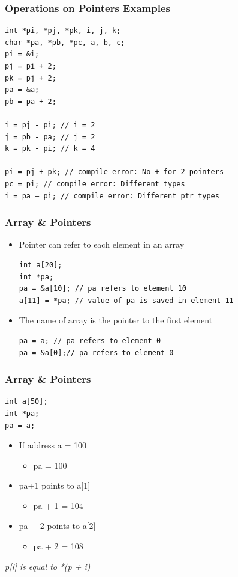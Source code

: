 \documentclass{../c-lecture}
\begin{document}
\begin{frame}[fragile]
  \frametitle{Operations on Pointers Examples}
  \begin{verbatim}
int *pi, *pj, *pk, i, j, k;
char *pa, *pb, *pc, a, b, c;
pi = &i;
pj = pi + 2;
pk = pj + 2;
pa = &a;
pb = pa + 2;

i = pj - pi; // i = 2
j = pb - pa; // j = 2
k = pk - pi; // k = 4

pi = pj + pk; // compile error: No + for 2 pointers
pc = pi; // compile error: Different types
i = pa – pi; // compile error: Different ptr types
  \end{verbatim}
\end{frame}

\begin{frame}[fragile]
  \frametitle{Array \& Pointers}
  \begin{itemize}
    \item Pointer can refer to each element in an array
    \begin{verbatim}
int a[20];
int *pa;
pa = &a[10]; // pa refers to element 10
a[11] = *pa; // value of pa is saved in element 11
    \end{verbatim}
    \item The name of array is the pointer to the first element
    \begin{verbatim}
pa = a; // pa refers to element 0
pa = &a[0];// pa refers to element 0
    \end{verbatim}
  \end{itemize}
\end{frame}

\begin{frame}[fragile]
  \frametitle{Array \& Pointers}
  \begin{verbatim}
int a[50];
int *pa;
pa = a;
  \end{verbatim}
  \begin{itemize}
    \item If address a = 100
    \begin{itemize}
      \item pa = 100
    \end{itemize}
    \item pa+1 points to a[1]
    \begin{itemize}
      \item pa + 1 = 104
    \end{itemize}
    \item pa + 2 points to a[2]
    \begin{itemize}
      \item pa + 2 = 108
    \end{itemize}
  \end{itemize}
  \begin{block}{}
    \textit{\color{YellowOrange}p[i]}
    \textit{\color{LimeGreen}is equal to}
    \textit{\color{Yellow}*(p + i)}
  \end{block}
\end{frame}
\end{document}
